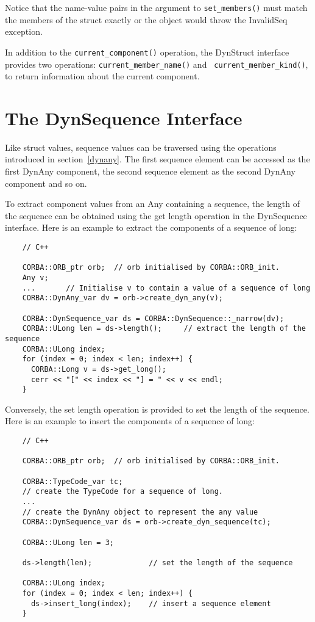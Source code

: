 \documentclass[11pt,twoside,onecolumn]{book}
\begin{document}
Notice that the name-value pairs in the argument to {\tt set\_members()}
must match the members of the struct exactly or the object would throw the
InvalidSeq exception.

In addition to the {\tt current\_component()} operation, the DynStruct
interface provides two operations: {\tt current\_member\_name()} and {\tt
current\_member\_kind()}, to return information about the current
component.

\section{The DynSequence Interface}

Like struct values, sequence values can be traversed using the operations
introduced in section~\ref{dynany}. The first sequence element can be
accessed as the first DynAny component, the second sequence element as the
second DynAny component and so on. 

To extract component values from an Any containing a sequence, the length
of the sequence can be obtained using the get length operation in the
DynSequence interface. Here is an example to extract the components of a
sequence of long:

{\small
\begin{verbatim}
    // C++
    
    CORBA::ORB_ptr orb;  // orb initialised by CORBA::ORB_init.
    Any v;
    ...       // Initialise v to contain a value of a sequence of long
    CORBA::DynAny_var dv = orb->create_dyn_any(v);
    
    CORBA::DynSequence_var ds = CORBA::DynSequence::_narrow(dv);
    CORBA::ULong len = ds->length();     // extract the length of the sequence
    CORBA::ULong index;
    for (index = 0; index < len; index++) {
      CORBA::Long v = ds->get_long();
      cerr << "[" << index << "] = " << v << endl;
    }
\end{verbatim}
}

Conversely, the set length operation is provided to set the length of the
sequence. Here is an example to insert the components of a sequence of
long:

{\small
\begin{verbatim}
    // C++
    
    CORBA::ORB_ptr orb;  // orb initialised by CORBA::ORB_init.
    
    CORBA::TypeCode_var tc;
    // create the TypeCode for a sequence of long.
    ...
    // create the DynAny object to represent the any value
    CORBA::DynSequence_var ds = orb->create_dyn_sequence(tc);
    
    CORBA::ULong len = 3;
    
    ds->length(len);             // set the length of the sequence
    
    CORBA::ULong index;
    for (index = 0; index < len; index++) {
      ds->insert_long(index);    // insert a sequence element
    }
\end{verbatim}
}
\end{document}
